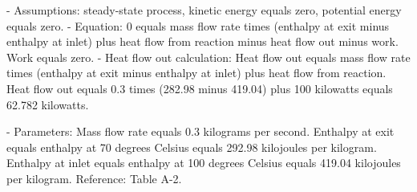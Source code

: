 - Assumptions: steady-state process, kinetic energy equals zero, potential energy equals zero.  
- Equation:  
  0 equals mass flow rate times (enthalpy at exit minus enthalpy at inlet) plus heat flow from reaction minus heat flow out minus work.  
  Work equals zero.  
- Heat flow out calculation:  
  Heat flow out equals mass flow rate times (enthalpy at exit minus enthalpy at inlet) plus heat flow from reaction.  
  Heat flow out equals 0.3 times (282.98 minus 419.04) plus 100 kilowatts equals 62.782 kilowatts.  

- Parameters:  
  Mass flow rate equals 0.3 kilograms per second.  
  Enthalpy at exit equals enthalpy at 70 degrees Celsius equals 292.98 kilojoules per kilogram.  
  Enthalpy at inlet equals enthalpy at 100 degrees Celsius equals 419.04 kilojoules per kilogram.  
  Reference: Table A-2.
